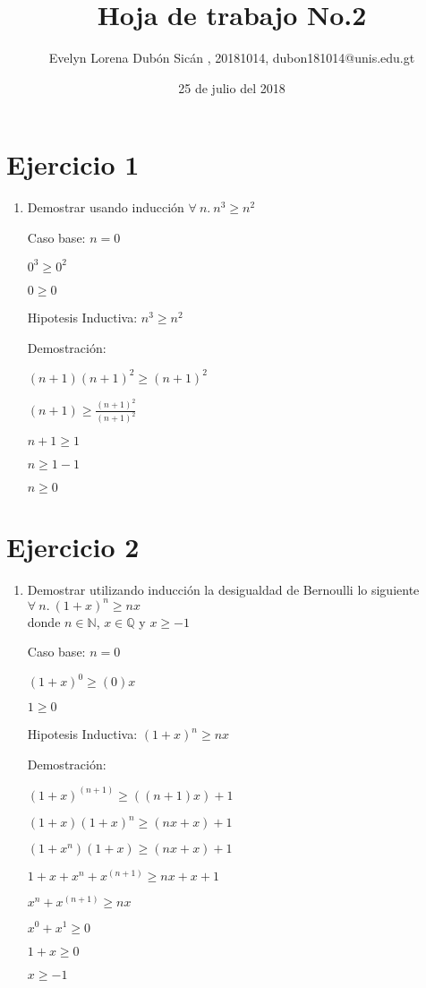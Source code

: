 \documentclass{article}
\author{Evelyn Lorena Dubón Sicán , 20181014, dubon181014@unis.edu.gt}
\title{Hoja de trabajo No.2}
\date{25 de julio del 2018}
\begin{document}
\maketitle

\section{Ejercicio 1}
\begin{enumerate}
    \item Demostrar usando inducción  $\forall\ n.\ n^3\geq n^2$ \par
    Caso base: $n=0$ \par
    $ 0^3\geq 0^2$ \par
    $0\geq 0$ \par
    Hipotesis Inductiva: $ n^3\geq n^2\ $ \par
    Demostración: \par
    $(n+1)(n+1)^2 \geq (n+1)^2$ \par
    $(n+1)\geq \frac{(n+1)^2}{(n+1)^2}$ \par
    $n+1\geq 1$ \par
    $n\geq 1-1$ \par
    $n\geq 0$
\end{enumerate}

\section{Ejercicio 2}
\begin{enumerate}
    \item Demostrar utilizando inducci\'on la desigualdad de Bernoulli lo siguiente $\forall\ n.\ (1+x)^n\geq nx $\\donde $n\in \mathbb{N}$, $x\in \mathbb{Q}$ y $x\geq -1$ \par
    Caso base: $n=0$ \par
    $ (1+x)^0\geq (0)x$ \par
    $1\geq 0$\par
    Hipotesis Inductiva: $ (1+x)^n\geq nx\ $ \par
    Demostración: \par
    $(1+x)^{(n+1)} \geq ((n+1)x)+1$ \par
    $(1+x)(1+x)^n\geq (nx+x)+1 $ \par
    $(1+x^n)(1+x)\geq (nx+x)+1$ \par
    $1+x+x^n+x^{(n+1)}\geq nx+x+1$ \par
    $x^n+x^{(n+1)} \geq nx$\par
    $x^0+x^1 \geq 0$\par
    $1+x \geq 0$\par
    $x \geq -1$
\end{enumerate}
\end{document}
